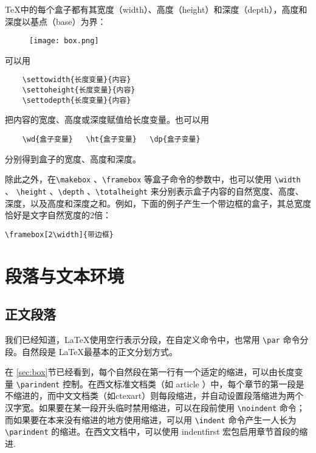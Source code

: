\TeX 中的每个盒子都有其宽度（width）、高度（height）和深度（depth），高度和深度以基点（base）为界：

\begin{figure}[H]
    \centering
    \texttt{[image: box.png]}
\end{figure}

可以用
\begin{lstlisting}
    \settowidth{长度变量}{内容}
    \settoheight{长度变量}{内容}
    \settodepth{长度变量}{内容}
\end{lstlisting}

把内容的宽度、高度或深度赋值给长度变量。也可以用
\begin{lstlisting}
    \wd{盒子变量}   \ht{盒子变量}   \dp{盒子变量}
\end{lstlisting}
分别得到盒子的宽度、高度和深度。

除此之外，在\verb|\makebox| 、\verb|\framebox| 等盒子命令的参数中，也可以使用 \verb|\width| 、 \verb|\height| 、\verb|\depth| 、\verb|\totalheight| 来分别表示盒子内容的自然宽度、高度、深度，以及高度和深度之和。例如，下面的例子产生一个带边框的盒子，其总宽度恰好是文字自然宽度的2倍：

\begin{minipage}[t]{0.45\textwidth}
\begin{lstlisting}
\framebox[2\width]{带边框}
\end{lstlisting}
\end{minipage}
\hfill
\begin{minipage}[t]{0.45\textwidth}
\end{minipage}

\section{段落与文本环境}

\subsection{正文段落}

我们已经知道，\LaTeX 使用空行表示分段，在自定义命令中，也常用 \verb|\par| 命令分段。自然段是 \LaTeX 最基本的正文分划方式。

在 \ref{sec:box}节已经看到，每个自然段在第一行有一个适定的缩进，可以由长度变量 \verb|\parindent| 控制。在西文标准文档类（如 article ）中，每个章节的第一段是不缩进的，而中文文档类（如ctexart）则每段缩进，并自动设置段落缩进为两个汉字宽。如果要在某一段开头临时禁用缩进，可以在段前使用 \verb|\noindent| 命令；而如果要在本来没有缩进的地方使用缩进，可以用 \verb|\indent| 命令产生一人长为 \verb|\parindent| 的缩进。在西文文档中，可以使用 indentfirst 宏包启用章节首段的缩进.

